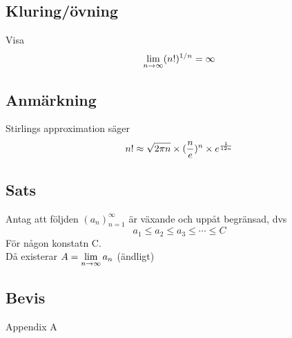 \documentclass{article}
\begin{document}
\subsection{Kluring/övning}
Visa
$$ \displaystyle \lim_{n \rightarrow \infty} (n!)^{1/n} = \infty $$

\subsection{Anmärkning}
Stirlings approximation säger
$$ n! \approx \sqrt{2\pi n} \times (\frac{n}{e})^n \times e^{\frac{1}{12n}} $$

\subsection{Sats}
Antag att följden $ (a_n)^\infty_{n=1}$ är växande och uppåt begränsad, dvs
$$ a_1 \le a_2 \le a_3 \le \cdots \le C $$
För någon konstatn C.\\
Då existerar $A = \displaystyle \lim_{n \rightarrow \infty} a_n$ (ändligt)

\subsection{Bevis}
Appendix A
\end{document}
